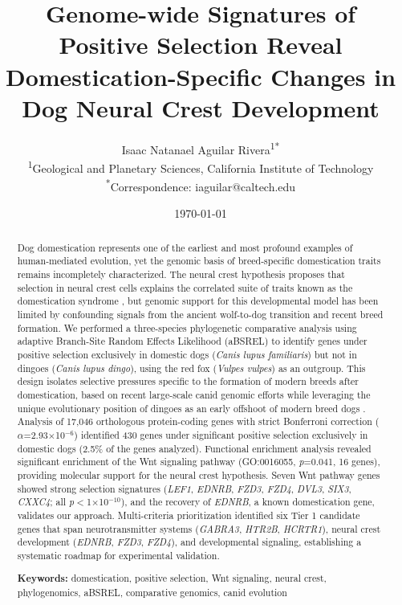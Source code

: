 \documentclass[11pt,letterpaper]{article}
\title{\textbf{Genome-wide Signatures of Positive Selection Reveal Domestication-Specific Changes in Dog Neural Crest Development}}
\author{
    Isaac Natanael Aguilar Rivera\textsuperscript{1*} \\
    \small \textsuperscript{1}Geological and Planetary Sciences, California Institute of Technology \\
    \small \textsuperscript{*}Correspondence: iaguilar@caltech.edu
}
\date{\today}
\begin{document}
\maketitle

\begin{abstract}
Dog domestication represents one of the earliest and most profound examples of human-mediated evolution, yet the genomic basis of breed-specific domestication traits remains incompletely characterized. The neural crest hypothesis proposes that selection in neural crest cells explains the correlated suite of traits known as the domestication syndrome \citep{Wilkins2014}, but genomic support for this developmental model has been limited by confounding signals from the ancient wolf-to-dog transition and recent breed formation. We performed a three-species phylogenetic comparative analysis using adaptive Branch-Site Random Effects Likelihood (aBSREL) to identify genes under positive selection exclusively in domestic dogs (\textit{Canis lupus familiaris}) but not in dingoes (\textit{Canis lupus dingo}), using the red fox (\textit{Vulpes vulpes}) as an outgroup. This design isolates selective pressures specific to the formation of modern breeds after domestication, based on recent large-scale canid genomic efforts \citep{Ostrander2024, Meadows2023} while leveraging the unique evolutionary position of dingoes as an early offshoot of modern breed dogs \citep{Cairns2022}. Analysis of 17,046 orthologous protein-coding genes with strict Bonferroni correction ($\alpha$=2.93$\times$10$^{-6}$) identified 430 genes under significant positive selection exclusively in domestic dogs (2.5\% of the genes analyzed). Functional enrichment analysis revealed significant enrichment of the Wnt signaling pathway (GO:0016055, \textit{p}=0.041, 16 genes), providing molecular support for the neural crest hypothesis. Seven Wnt pathway genes showed strong selection signatures (\textit{LEF1}, \textit{EDNRB}, \textit{FZD3}, \textit{FZD4}, \textit{DVL3}, \textit{SIX3}, \textit{CXXC4}; all \textit{p}$<$1$\times$10$^{-10}$), and the recovery of \textit{EDNRB}, a known domestication gene, validates our approach. Multi-criteria prioritization identified six Tier 1 candidate genes that span neurotransmitter systems (\textit{GABRA3}, \textit{HTR2B}, \textit{HCRTR1}), neural crest development (\textit{EDNRB}, \textit{FZD3}, \textit{FZD4}), and developmental signaling, establishing a systematic roadmap for experimental validation.

\textbf{Keywords:} domestication, positive selection, Wnt signaling, neural crest, phylogenomics, aBSREL, comparative genomics, canid evolution
\end{abstract}
\end{document}
